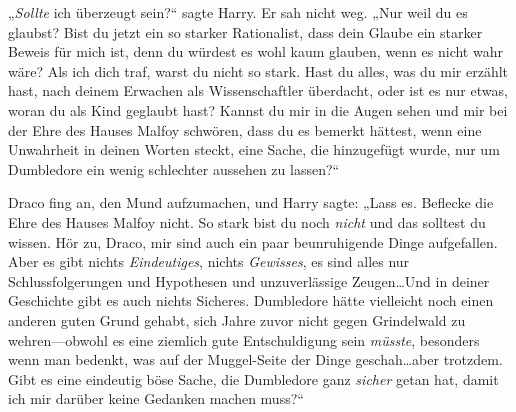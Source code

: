 „\emph{Sollte} ich überzeugt sein?“ sagte Harry. Er sah nicht weg. „Nur weil du es glaubst? Bist du jetzt ein so starker Rationalist, dass dein Glaube ein starker Beweis für mich ist, denn du würdest es wohl kaum glauben, wenn es nicht wahr wäre? Als ich dich traf, warst du nicht so stark. Hast du alles, was du mir erzählt hast, nach deinem Erwachen als Wissenschaftler überdacht, oder ist es nur etwas, woran du als Kind geglaubt hast? Kannst du mir in die Augen sehen und mir bei der Ehre des Hauses Malfoy schwören, dass du es bemerkt hättest, wenn eine Unwahrheit in deinen Worten steckt, eine Sache, die hinzugefügt wurde, nur um Dumbledore ein wenig schlechter aussehen zu lassen?“

Draco fing an, den Mund aufzumachen, und Harry sagte: „Lass es. Beflecke die Ehre des Hauses Malfoy nicht. So stark bist du noch \emph{nicht} und das solltest du wissen. Hör zu, Draco, mir sind auch ein paar beunruhigende Dinge aufgefallen. Aber es gibt nichts \emph{Eindeutiges}, nichts \emph{Gewisses}, es sind alles nur Schlussfolgerungen und Hypothesen und unzuverlässige Zeugen…Und in deiner Geschichte gibt es auch nichts Sicheres. Dumbledore hätte vielleicht noch einen anderen guten Grund gehabt, sich Jahre zuvor nicht gegen Grindelwald zu wehren—obwohl es eine ziemlich gute Entschuldigung sein \emph{müsste}, besonders wenn man bedenkt, was auf der Muggel-Seite der Dinge geschah…aber trotzdem. Gibt es eine eindeutig böse Sache, die Dumbledore ganz \emph{sicher} getan hat, damit ich mir darüber keine Gedanken machen muss?“


